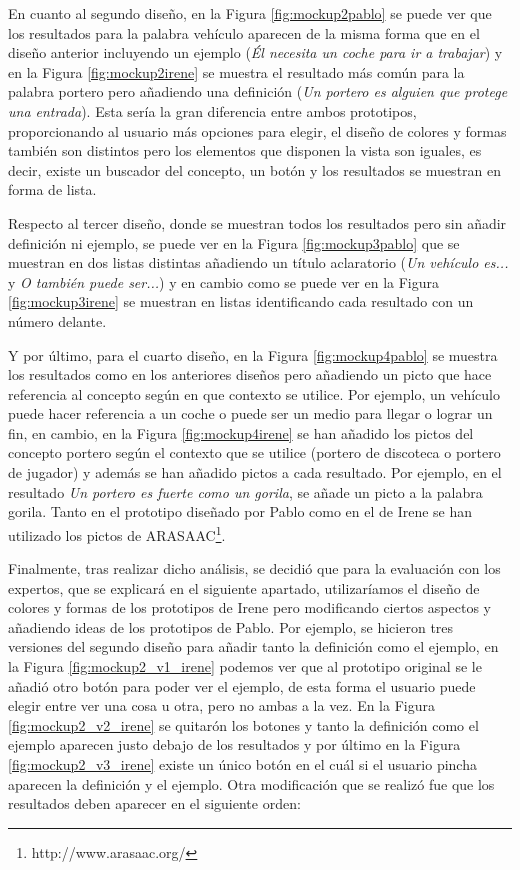 En cuanto al segundo diseño, en la Figura \ref{fig:mockup2pablo} se puede ver que los resultados para la palabra vehículo aparecen de la misma forma que en el diseño anterior incluyendo un ejemplo (\textit{Él necesita un coche para ir a trabajar}) y en la Figura \ref{fig:mockup2irene} se muestra el resultado más común para la palabra portero pero añadiendo una definición (\textit{Un portero es alguien que protege una entrada}). Esta sería la gran diferencia entre ambos prototipos, proporcionando al usuario más opciones para elegir, el diseño de colores y formas también son distintos pero los elementos que disponen la vista son iguales, es decir, existe un buscador del concepto, un botón y los resultados se muestran en forma de lista.

Respecto al tercer diseño, donde se muestran todos los resultados pero sin añadir definición ni ejemplo, se puede ver en la Figura \ref{fig:mockup3pablo} que se muestran en dos listas distintas añadiendo un título aclaratorio (\textit{Un vehículo es...} y \textit{O también puede ser...}) y en cambio como se puede ver en la Figura \ref{fig:mockup3irene} se muestran en listas identificando cada resultado con un número delante.

Y por último, para el cuarto diseño, en la Figura \ref{fig:mockup4pablo} se muestra los resultados como en los anteriores diseños pero añadiendo un picto que hace referencia al concepto según en que contexto se utilice. Por ejemplo, un vehículo puede hacer referencia a un coche o puede ser un medio para llegar o lograr un fin, en cambio, en la Figura \ref{fig:mockup4irene} se han añadido los pictos del concepto portero según el contexto que se utilice (portero de discoteca o portero de jugador) y además se han añadido pictos a cada resultado. Por ejemplo, en el resultado \textit{Un portero es fuerte como un gorila}, se añade un picto a la palabra gorila. 
Tanto en el prototipo diseñado por Pablo como en el de Irene se han utilizado los pictos de ARASAAC\footnote{http://www.arasaac.org/}.

Finalmente, tras realizar dicho análisis, se decidió que para la evaluación con los expertos, que se explicará en el siguiente apartado, utilizaríamos el diseño de colores y formas de los prototipos de Irene pero modificando ciertos aspectos y añadiendo ideas de los prototipos de Pablo. Por ejemplo, se hicieron tres versiones del segundo diseño para añadir tanto la definición como el ejemplo, en la Figura \ref{fig:mockup2_v1_irene} podemos ver que al prototipo original se le añadió otro botón para poder ver el ejemplo, de esta forma el usuario puede elegir entre ver una cosa u otra, pero no ambas a la vez. En la Figura \ref{fig:mockup2_v2_irene} se quitarón los botones y tanto la definición como el ejemplo aparecen justo debajo de los resultados y por último en la Figura \ref{fig:mockup2_v3_irene} existe un único botón en el cuál si el usuario pincha aparecen la definición y el ejemplo.
Otra modificación que se realizó fue que los resultados deben aparecer en el siguiente orden:

